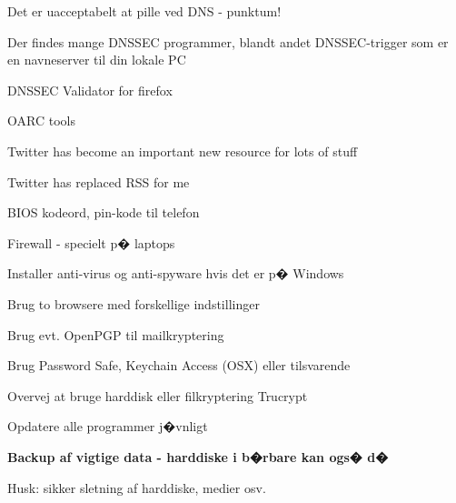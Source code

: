 \documentclass[20pt,landscape,a4paper,footrule]{foils}
\begin{document}
\centerline{\Large Det er uacceptabelt at pille ved DNS - punktum!}



Der findes mange DNSSEC programmer, blandt andet DNSSEC-trigger som er en navneserver til din lokale PC

\begin{list2}
\item DNSSEC Validator for firefox\\ 
\item OARC tools 
\item {}
\end{list2}






\begin{list1}
\item Twitter has become an important new resource for lots of stuff
\item Twitter has replaced RSS for me
\end{list1}



\begin{list2}
\item BIOS kodeord, pin-kode til telefon
\item Firewall - specielt p� laptops
\item Installer anti-virus og anti-spyware hvis det er p� Windows
\item Brug to browsere med forskellige indstillinger
\item Brug evt. OpenPGP til mailkryptering
\item Brug Password Safe, Keychain Access (OSX) eller tilsvarende
\item Overvej at bruge harddisk eller filkryptering Trucrypt 
\item Opdatere alle programmer j�vnligt
\item {\bf Backup af vigtige data - harddiske i b�rbare kan ogs� d�}
\item Husk: sikker sletning af harddiske, medier osv.
\end{list2}
\end{document}
